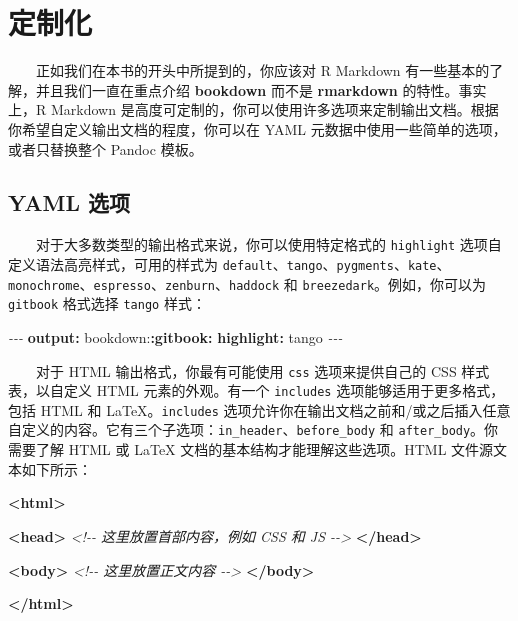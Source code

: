 \documentclass[
  12pt,
]{krantz}
\newenvironment{Shaded}{\begin{snugshade}}{\end{snugshade}}
\newcommand{\AttributeTok}[1]{\textcolor[rgb]{0.13,0.29,0.53}{#1}}
\newcommand{\CommentTok}[1]{\textcolor[rgb]{0.56,0.35,0.01}{\textit{#1}}}
\newcommand{\FunctionTok}[1]{\textcolor[rgb]{0.13,0.29,0.53}{\textbf{#1}}}
\newcommand{\KeywordTok}[1]{\textcolor[rgb]{0.13,0.29,0.53}{\textbf{#1}}}
\newcommand{\PreprocessorTok}[1]{\textcolor[rgb]{0.56,0.35,0.01}{\textit{#1}}}
\theoremstyle{definition}
\theoremstyle{definition}
\theoremstyle{definition}
\theoremstyle{definition}
\theoremstyle{remark}
\begin{document}
\hypertarget{customization}{%
\chapter{定制化}\label{customization}}

  正如我们在本书的开头中所提到的，你应该对 R Markdown 有一些基本的了解，并且我们一直在重点介绍 \textbf{bookdown} 而不是 \textbf{rmarkdown} 的特性。事实上，R Markdown 是高度可定制的，你可以使用许多选项来定制输出文档。根据你希望自定义输出文档的程度，你可以在 YAML 元数据中使用一些简单的选项，或者只替换整个 Pandoc 模板。

\hypertarget{yaml-options}{%
\section{YAML 选项}\label{yaml-options}}

  对于大多数类型的输出格式来说，你可以使用特定格式的 \texttt{highlight} 选项自定义语法高亮样式，可用的样式为 \texttt{default}、\texttt{tango}、\texttt{pygments}、\texttt{kate}、\texttt{monochrome}、\texttt{espresso}、\texttt{zenburn}、\texttt{haddock} 和 \texttt{breezedark}。例如，你可以为 \texttt{gitbook} 格式选择 \texttt{tango} 样式：

\begin{Shaded}
\begin{Highlighting}[]
\PreprocessorTok{{-}{-}{-}}
\FunctionTok{output}\KeywordTok{:}
\AttributeTok{  bookdown:}\FunctionTok{:gitbook}\KeywordTok{:}
\AttributeTok{    }\FunctionTok{highlight}\KeywordTok{:}\AttributeTok{ tango}
\PreprocessorTok{{-}{-}{-}}
\end{Highlighting}
\end{Shaded}

  对于 HTML 输出格式，你最有可能使用 \texttt{css} 选项来提供自己的 CSS 样式表，以自定义 HTML 元素的外观。有一个 \texttt{includes} 选项能够适用于更多格式，包括 HTML 和 LaTeX。\texttt{includes} 选项允许你在输出文档之前和/或之后插入任意自定义的内容。它有三个子选项：\texttt{in\_header}、\texttt{before\_body} 和 \texttt{after\_body}。你需要了解 HTML 或 LaTeX 文档的基本结构才能理解这些选项。HTML 文件源文本如下所示：

\begin{Shaded}
\begin{Highlighting}[]
\KeywordTok{\textless{}html\textgreater{}}
  
  \KeywordTok{\textless{}head\textgreater{}}
  \CommentTok{\textless{}!{-}{-} 这里放置首部内容，例如 CSS 和 JS {-}{-}\textgreater{}}
  \KeywordTok{\textless{}/head\textgreater{}}
  
  \KeywordTok{\textless{}body\textgreater{}}
  \CommentTok{\textless{}!{-}{-} 这里放置正文内容 {-}{-}\textgreater{}}
  \KeywordTok{\textless{}/body\textgreater{}}

\KeywordTok{\textless{}/html\textgreater{}}
\end{Highlighting}
\end{Shaded}
\end{document}

